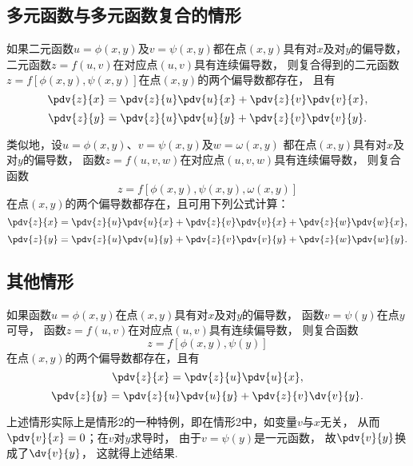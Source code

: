 \subsection{多元函数与多元函数复合的情形}
\begin{theorem}
如果二元函数\(u=\phi(x,y)\)及\(v=\psi(x,y)\)都在点\((x,y)\)具有对\(x\)及对\(y\)的偏导数，
二元函数\(z=f(u,v)\)在对应点\((u,v)\)具有连续偏导数，
则复合得到的二元函数\(z=f[\phi(x,y),\psi(x,y)]\)在点\((x,y)\)的两个偏导数都存在，
且有\begin{equation*}
	\pdv{z}{x} = \pdv{z}{u}\pdv{u}{x} + \pdv{z}{v}\pdv{v}{x},
\end{equation*}\begin{equation*}
	\pdv{z}{y} = \pdv{z}{u}\pdv{u}{y} + \pdv{z}{v}\pdv{v}{y}.
\end{equation*}
\end{theorem}
类似地，设\(u=\phi(x,y)\)、\(v=\psi(x,y)\)及\(w=\omega(x,y)\)
都在点\((x,y)\)具有对\(x\)及对\(y\)的偏导数，
函数\(z=f(u,v,w)\)在对应点\((u,v,w)\)具有连续偏导数，
则复合函数\begin{equation*}
	z = f[\phi(x,y),\psi(x,y),\omega(x,y)]
\end{equation*}
在点\((x,y)\)的两个偏导数都存在，且可用下列公式计算：\begin{equation*}
	\pdv{z}{x} = \pdv{z}{u}\pdv{u}{x} + \pdv{z}{v}\pdv{v}{x} + \pdv{z}{w}\pdv{w}{x},
\end{equation*}\begin{equation*}
	\pdv{z}{y} = \pdv{z}{u}\pdv{u}{y} + \pdv{z}{v}\pdv{v}{y} + \pdv{z}{w}\pdv{w}{y}.
\end{equation*}

\subsection{其他情形}
\begin{theorem}
如果函数\(u=\phi(x,y)\)在点\((x,y)\)具有对\(x\)及对\(y\)的偏导数，
函数\(v=\psi(y)\)在点\(y\)可导，
函数\(z=f(u,v)\)在对应点\((u,v)\)具有连续偏导数，
则复合函数\begin{equation*}
	z = f[\phi(x,y),\psi(y)]
\end{equation*}
在点\((x,y)\)的两个偏导数都存在，且有\begin{equation*}
	\pdv{z}{x} = \pdv{z}{u} \pdv{u}{x},
\end{equation*}\begin{equation*}
	\pdv{z}{y} = \pdv{z}{u} \pdv{u}{y} + \pdv{z}{v} \dv{v}{y}.
\end{equation*}
\end{theorem}
上述情形实际上是情形2的一种特例，即在情形2中，如变量\(v\)与\(x\)无关，
从而\(\pdv{v}{x}=0\)；在\(v\)对\(y\)求导时，
由于\(v=\psi(y)\)是一元函数，
故\(\pdv{v}{y}\)换成了\(\dv{v}{y}\)，
这就得上述结果.

